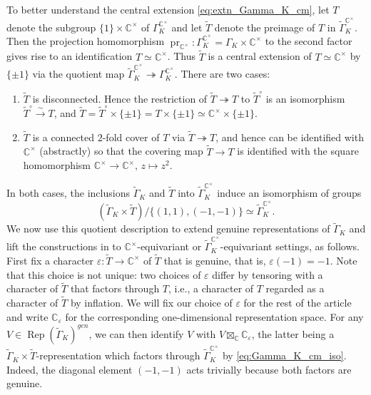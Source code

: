 \documentclass[11pt, a4paper]{amsart}
\newcommand{\C}{\mathbb{C}}
\newcommand{\tGamma}{\widetilde{\Gamma}}
\DeclareMathOperator{\Rep}{Rep}
\newcommand{\pr}{\operatorname{pr}}
\newcommand{\cm}{\C^\times}
\theoremstyle{definition}
\numberwithin{equation}{section}
\begin{document}
To better understand the central extension \eqref{eq:extn_Gamma_K_cm}, let $T$ denote the subgroup $\{1\} \times \cm$ of $\Gamma_K^{\cm}$ and let $\widetilde{T}$ denote the preimage of $T$ in $\tGamma_K^{\cm}$.
Then the projection homomorphism $\pr_{\cm}: \Gamma_K^{\cm} = \Gamma_K \times \cm$ to the second factor gives rise to an identification $T \simeq \cm$. Thus $\widetilde{T}$ is a central extension of $T \simeq \cm$ by $\{\pm 1\}$ via the quotient map $\tGamma_K^{\cm} \twoheadrightarrow \Gamma_K^{\cm}$. There are two cases:
\begin{enumerate}[label=(\alph*), itemindent=*, leftmargin=*]
	\item $\widetilde{T}$ is disconnected. Hence the restriction of $\widetilde{T} \twoheadrightarrow T$ to $\widetilde{T}^\circ$ is an isomorphism $\widetilde{T}^\circ \xrightarrow{\sim} T$, and $\widetilde{T} = \widetilde{T}^\circ \times \{\pm 1\} = T \times \{\pm 1\}\simeq \cm \times \{\pm 1\}$.

	\item $\widetilde{T}$ is a connected $2$-fold cover of $T$ via $\widetilde{T} \twoheadrightarrow T$, and hence can be identified with $\cm$ (abstractly) so that the covering map $\widetilde{T} \to T$ is identified with the square homomorphism $\cm \to \cm,\, z \mapsto z^2$.
\end{enumerate}
In both cases, the inclusions $\tGamma_K$ and $\widetilde{T}$ into $\tGamma_K^{\cm}$ induce an isomorphism of groups 
\begin{equation} \label{eq:Gamma_K_cm_iso}
	(\tGamma_K \times \widetilde{T}) / \{(1, 1), (-1, -1)\} \simeq \tGamma_K^{\cm}.
\end{equation}
We now use this quotient description to extend genuine representations of $\tGamma_K$ and lift the constructions in  to $\cm$-equivariant or $\tGamma_K^{\cm}$-equivariant settings, as follows. 
First fix a character $\varepsilon: \widetilde{T} \to \cm$ of $\widetilde{T}$ that is genuine, that is, $\varepsilon(-1) = -1$. 
Note that this choice is not unique: two choices of $\varepsilon$ differ by tensoring with a character of $\widetilde{T}$ that factors through $T$, i.e., a character of $T$ regarded as a character of $\widetilde{T}$ by inflation. We will fix our choice of $\varepsilon$ for the rest of the article and write $\C_\varepsilon$ for the corresponding one-dimensional representation space. 
For any $V \in \Rep(\tGamma_K)^{gen}$, we can then identify $V$ with $V \boxtimes_\C \C_\varepsilon$, the latter being a $\tGamma_K \times \widetilde{T}$-representation which factors through $\tGamma_K^{\cm}$ by \eqref{eq:Gamma_K_cm_iso}. Indeed, the diagonal element $(-1, -1)$ acts trivially because both factors are genuine.
\end{document}
